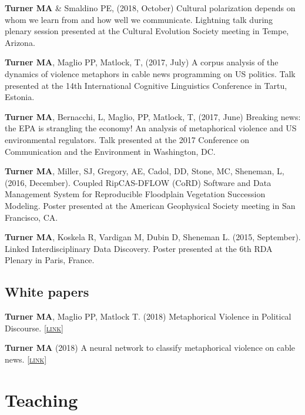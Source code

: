 \documentclass[11pt, letterpaper]{article}
\newcommand{\lurl}[1]{\href{#1}{\scriptsize\textsc{[link]}}}
\begin{document}
\textbf{Turner MA} \& Smaldino PE, (2018, October) Cultural polarization depends on whom we learn from and how well we communicate. Lightning talk during plenary session presented at the Cultural Evolution Society meeting in Tempe, Arizona.

\textbf{Turner MA}, Maglio PP, Matlock, T, (2017, July) A corpus analysis of the dynamics of violence metaphors in cable news programming on US politics. Talk presented at the 14th International Cognitive Linguistics Conference in Tartu, Estonia.

\textbf{Turner MA}, Bernacchi, L, Maglio, PP, Matlock, T, (2017, June) Breaking
news: the EPA is strangling the economy! An analysis of metaphorical violence
and US environmental regulators. Talk presented at the 2017 Conference on
Communication and the Environment in Washington, DC.

\textbf{Turner MA}, Miller, SJ, Gregory, AE, Cadol, DD, Stone, MC, Sheneman, L, (2016, December). Coupled RipCAS-DFLOW (CoRD) Software and Data Management System for Reproducible Floodplain Vegetation Succession Modeling. Poster presented at the American Geophysical Society meeting in San Francisco, CA.

\textbf{Turner MA}, Koskela R, Vardigan M, Dubin D, Sheneman L. (2015, September). Linked Interdisciplinary Data Discovery. Poster presented at the 6th RDA Plenary in Paris, France. 


\subsection{White papers}

  \textbf{Turner MA}, Maglio PP, Matlock T. (2018) Metaphorical Violence in Political Discourse. 
  \lurl{https://doi.org/10.31235/osf.io/t8yg9}

  \textbf{Turner MA} (2018) A neural network to classify metaphorical violence
  on cable news. \lurl{https://arxiv.org/abs/1810.08677}


\section*{Teaching}
\end{document}
